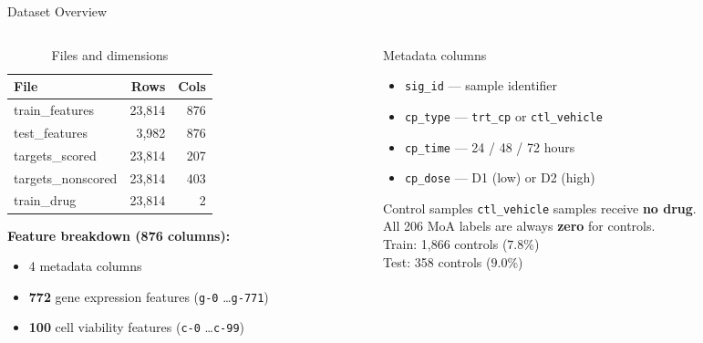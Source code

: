 \documentclass[aspectratio=169, 10pt]{beamer}
\begin{document}
\begin{frame}{Dataset Overview}
  \begin{columns}[T]
    \begin{column}{0.5\textwidth}
      \begin{table}
        \caption{Files and dimensions}
        \small
        \begin{tabular}{lrr}
          \toprule
          \textbf{File} & \textbf{Rows} & \textbf{Cols} \\
          \midrule
          train\_features  & 23,814 & 876 \\
          test\_features   & 3,982  & 876 \\
          targets\_scored  & 23,814 & 207 \\
          targets\_nonscored & 23,814 & 403 \\
          train\_drug      & 23,814 & 2   \\
          \bottomrule
        \end{tabular}
      \end{table}
      \vspace{0.5em}
      \textbf{Feature breakdown (876 columns):}
      \begin{itemize}
        \item 4 metadata columns
        \item \textbf{772} gene expression features (\texttt{g-0} \ldots \texttt{g-771})
        \item \textbf{100} cell viability features (\texttt{c-0} \ldots \texttt{c-99})
      \end{itemize}
    \end{column}
    \begin{column}{0.47\textwidth}
      \begin{block}{Metadata columns}
        \begin{itemize}
          \item \texttt{sig\_id} — sample identifier
          \item \texttt{cp\_type} — \texttt{trt\_cp} or \texttt{ctl\_vehicle}
          \item \texttt{cp\_time} — 24 / 48 / 72 hours
          \item \texttt{cp\_dose} — D1 (low) or D2 (high)
        \end{itemize}
      \end{block}
      \vspace{0.4em}
      \begin{alertblock}{Control samples}
        \texttt{ctl\_vehicle} samples receive \textbf{no drug}.\\
        All 206 MoA labels are always \textbf{zero} for controls.\\[0.3em]
        Train: 1,866 controls ($7.8\%$)\\
        Test: \phantom{1,}358 controls ($9.0\%$)
      \end{alertblock}
    \end{column}
  \end{columns}
\end{frame}
\end{document}
